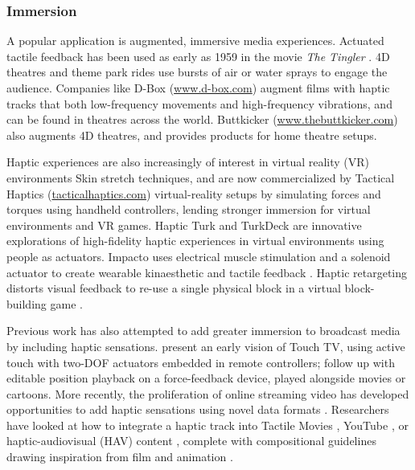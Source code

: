 \subsubsection{Immersion}
A popular application is augmented, immersive media experiences.
Actuated tactile feedback has been used as early as 1959 in the movie \emph{The Tingler}  \cite{IJsselsteijn2003}.
4D theatres and theme park rides use bursts of air or water sprays to engage the audience.
Companies like D-Box (\url{www.d-box.com}) augment films with haptic tracks that  both low-frequency movements and high-frequency vibrations, and can be found in theatres across the world.
Buttkicker (\url{www.thebuttkicker.com}) also augments 4D theatres, and provides products for home theatre setups.

Haptic experiences are also increasingly of interest in virtual reality (VR) environments 
Skin stretch techniques,  and are now commercialized by Tactical Haptics (\url{tacticalhaptics.com})  virtual-reality setups by simulating forces and torques using handheld controllers, lending stronger immersion for virtual environments and VR games.
Haptic Turk \cite{Cheng2014} and TurkDeck \cite{Cheng2015} are innovative explorations of high-fidelity haptic experiences in virtual environments using people as actuators.
Impacto uses electrical muscle stimulation and a solenoid actuator to create wearable kinaesthetic and tactile feedback \cite{Lopes2015}.
Haptic retargeting distorts visual feedback to re-use a single physical block in a virtual block-building game \cite{Azmandian2016}.

Previous work has also attempted to add greater immersion to broadcast media by including haptic sensations.
\citet{Modhrain2001} present an early vision of Touch TV, using active touch with two-DOF actuators embedded in remote controllers; \citet{Gaw2006} follow up with editable position playback on a force-feedback device, played alongside movies or cartoons.
More recently, the proliferation of online streaming video has developed opportunities to add haptic sensations using novel data formats .
Researchers have looked at how to integrate a haptic track into Tactile Movies \cite{Kim2009}, YouTube  \cite{Gao2013}, or haptic-audiovisual (HAV) content \cite{Danieau2013}, complete with compositional guidelines drawing inspiration from film and animation \cite{Guillotel2016}.

